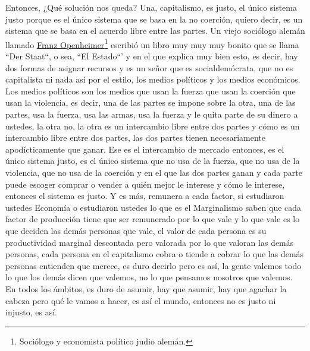 Entonces, ¿Qué solución nos queda? Una, capitalismo, es justo, el único sistema justo porque es el único sistema que se basa en la no coerción, quiero decir, es un sistema que se basa en el acuerdo libre entre las partes. Un viejo sociólogo alemán llamado \href{https://en.wikipedia.org/wiki/Franz_Oppenheimer}{Franz Openheimer}\footnote{Sociólogo y economista político judio alemán.} escribió un libro muy muy muy bonito que se llama ``Der Staat``\cite{oppenheimer1908state}, o sea, ``El Estado``' y en el que explica muy bien esto, es decir, hay dos formas de asignar recursos y es un señor que es socialdemócrata, que no es capitalista ni nada así por el estilo, los medios políticos y los medios económicos. Los medios políticos son los medios que usan la fuerza que usan la coerción que usan la violencia, es decir, una de las partes se impone sobre la otra, una de las partes, usa la fuerza, usa las armas, usa la fuerza y le quita parte de su dinero a ustedes, la otra no, la otra es un intercambio libre entre dos partes y cómo es un intercambio libre entre dos partes, las dos partes tienen necesariamente apodícticamente que ganar. Ese es el intercambio de mercado entonces, es el único sistema justo, es el único sistema que no usa de la fuerza, que no usa de la violencia, que no usa de la coerción y en el que las dos partes ganan y cada parte puede escoger comprar o vender a quién mejor le interese y cómo le interese, entonces el sistema es justo. Y es más, remunera a cada factor, si estudiaron ustedes Economía o estudiaron ustedes lo que es el Marginalismo saben que cada factor de producción tiene que ser remunerado por lo que vale y lo que vale es lo que deciden las demás personas que vale, el valor de cada persona es su productividad marginal descontada pero valorada por lo que valoran las demás personas, cada persona en el capitalismo cobra o tiende a cobrar lo que las demás personas entienden que merece, es duro decirlo pero es así, la gente valemos todo lo que los demás dicen que valemos, no lo que pensamos nosotros que valemos. En todos los ámbitos, es duro de asumir, hay que asumir, hay que agachar la cabeza pero qué le vamos a hacer, es así el mundo, entonces no es justo ni injusto, es así.

